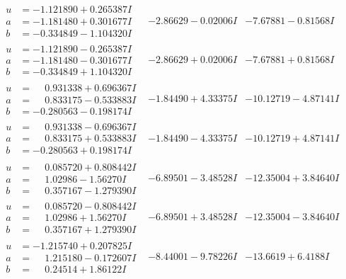 \documentclass[1p]{elsarticle_modified}
\theoremstyle{definition}
\begin{document}
$$\begin{array}{c|c|c}
\begin{aligned}
u &= -1.121890 + 0.265387 I \\
a &= -1.181480 + 0.301677 I \\
b &= -0.334849 - 1.104320 I\end{aligned}
 & -2.86629 - 0.02006 I & -7.67881 - 0.81568 I \\ \hline\begin{aligned}
u &= -1.121890 - 0.265387 I \\
a &= -1.181480 - 0.301677 I \\
b &= -0.334849 + 1.104320 I\end{aligned}
 & -2.86629 + 0.02006 I & -7.67881 + 0.81568 I \\ \hline\begin{aligned}
u &= \phantom{-}0.931338 + 0.696367 I \\
a &= \phantom{-}0.833175 - 0.533883 I \\
b &= -0.280563 - 0.198174 I\end{aligned}
 & -1.84490 + 4.33375 I & -10.12719 - 4.87141 I \\ \hline\begin{aligned}
u &= \phantom{-}0.931338 - 0.696367 I \\
a &= \phantom{-}0.833175 + 0.533883 I \\
b &= -0.280563 + 0.198174 I\end{aligned}
 & -1.84490 - 4.33375 I & -10.12719 + 4.87141 I \\ \hline\begin{aligned}
u &= \phantom{-}0.085720 + 0.808442 I \\
a &= \phantom{-}1.02986 - 1.56270 I \\
b &= \phantom{-}0.357167 - 1.279390 I\end{aligned}
 & -6.89501 - 3.48528 I & -12.35004 + 3.84640 I \\ \hline\begin{aligned}
u &= \phantom{-}0.085720 - 0.808442 I \\
a &= \phantom{-}1.02986 + 1.56270 I \\
b &= \phantom{-}0.357167 + 1.279390 I\end{aligned}
 & -6.89501 + 3.48528 I & -12.35004 - 3.84640 I \\ \hline\begin{aligned}
u &= -1.215740 + 0.207825 I \\
a &= \phantom{-}1.215180 - 0.172607 I \\
b &= \phantom{-}0.24514 + 1.86122 I\end{aligned}
 & -8.44001 - 9.78226 I & -13.6619 + 6.4188 I \\ \hline\begin{aligned}

\end{aligned}
\end{array}$$
\end{document}
